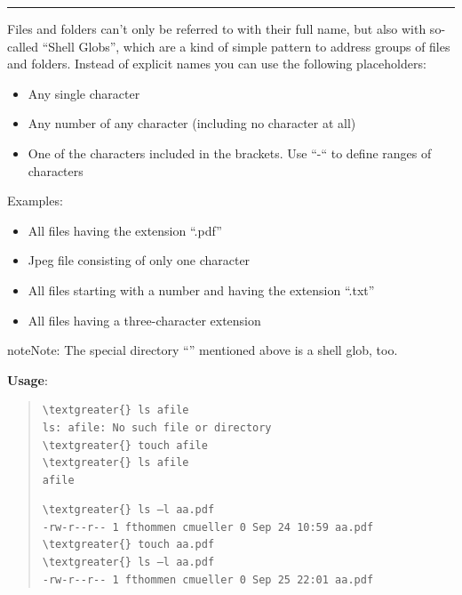 \documentclass[letterpaper,10pt,english]{sphinxmanual}
\begin{document}
\bigskip\hrule{}\bigskip


Files and folders can’t only be referred to with their full name, but also with so-called “Shell Globs”, which are a kind of simple pattern to address groups of files and folders.  Instead of explicit names you can use the following placeholders:
\begin{itemize}
\item {} 
  Any single character

\item {} 
\code{*:}  Any number of any character (including no character at all)

\item {} 
\code{{[}...{]}:}    One of the characters included in the brackets.  Use “-“ to define ranges  of characters

\end{itemize}

Examples:
\begin{itemize}
\item {} 
  All files having the extension “.pdf”

\item {} 
  Jpeg file consisting of only one character

\item {} 
 All files starting with a number and having the extension “.txt”

\item {} 
  All files having a three-character extension

\end{itemize}

\begin{notice}{note}{Note:}
The special directory “\code{\textasciitilde{}}” mentioned above is a shell glob, too.
\end{notice}

\textbf{Usage}:  
\begin{quote}

\begin{Verbatim}[commandchars=\\\{\}]
\textgreater{} ls afile
ls: afile: No such file or directory
\textgreater{} touch afile
\textgreater{} ls afile
afile
\end{Verbatim}

\begin{Verbatim}[commandchars=\\\{\}]
\textgreater{} ls –l aa.pdf
-rw-r--r-- 1 fthommen cmueller 0 Sep 24 10:59 aa.pdf
\textgreater{} touch aa.pdf
\textgreater{} ls –l aa.pdf
-rw-r--r-- 1 fthommen cmueller 0 Sep 25 22:01 aa.pdf
\end{Verbatim}
\end{quote}
\end{document}

